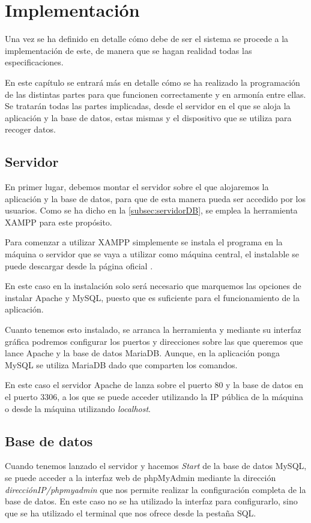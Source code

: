 \chapter{Implementación}
\label{ch:implementacion}
Una vez se ha definido en detalle cómo debe de ser el sistema se procede a la implementación de este, de manera que se hagan realidad todas las especificaciones. 

En este capítulo se entrará más en detalle cómo se ha realizado la programación de las distintas partes para que funcionen correctamente y en armonía entre ellas. Se tratarán todas las partes implicadas, desde el servidor en el que se aloja la aplicación y la base de datos, estas mismas y el dispositivo que se utiliza para recoger datos.

\section{Servidor}
En primer lugar, debemos montar el servidor sobre el que alojaremos la aplicación y la base de datos, para que de esta manera pueda ser accedido por los usuarios. Como se ha dicho en la \autoref{subsec:servidorDB}, se emplea la herramienta XAMPP para este propósito.

Para comenzar a utilizar XAMPP simplemente se instala el programa en la máquina o servidor que se vaya a utilizar como máquina central, el instalable se puede descargar desde la página oficial \cite{noauthor_xampp_nodate}.

En este caso en la instalación solo será necesario que marquemos las opciones de instalar Apache y MySQL, puesto que es suficiente para el funcionamiento de la aplicación.

Cuanto tenemos esto instalado, se arranca la herramienta y mediante su interfaz gráfica podremos configurar los puertos y direcciones sobre las que queremos que lance Apache y la base de datos MariaDB. Aunque, en la aplicación ponga MySQL se utiliza MariaDB dado que comparten los comandos.

En este caso el servidor Apache de lanza sobre el puerto 80 y la base de datos en el puerto 3306, a los que se puede acceder utilizando la IP pública de la máquina o desde la máquina utilizando \textit{localhost}.

\section{Base de datos}
Cuando tenemos lanzado el servidor y hacemos \textit{Start} de la base de datos MySQL, se puede acceder a la interfaz web de phpMyAdmin mediante la dirección \textit{direcciónIP/phpmyadmin} que nos permite realizar la configuración completa de la base de datos. En este caso no se ha utilizado la interfaz para configurarlo, sino que se ha utilizado el terminal que nos ofrece desde la pestaña SQL. 
\pagebreak


